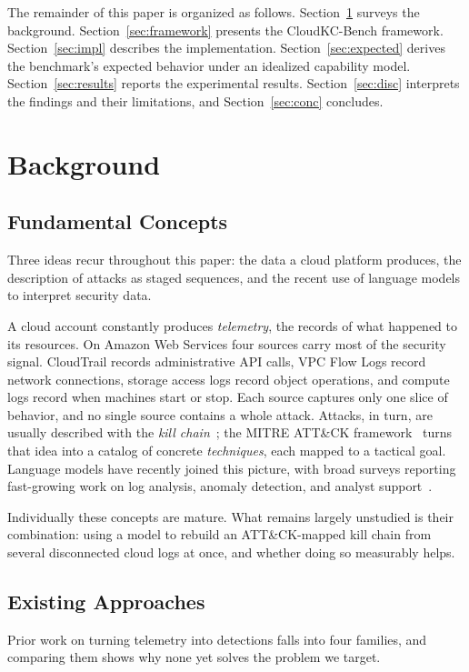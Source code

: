 \documentclass[journal]{IEEEtran}
\begin{document}
The remainder of this paper is organized as follows. Section~\ref{sec:bg} surveys the background.
Section~\ref{sec:framework} presents the CloudKC-Bench framework. Section~\ref{sec:impl} describes the
implementation. Section~\ref{sec:expected} derives the benchmark's expected behavior under an idealized
capability model. Section~\ref{sec:results} reports the experimental results. Section~\ref{sec:disc}
interprets the findings and their limitations, and Section~\ref{sec:conc} concludes.

\section{Background}\label{sec:bg}

\subsection{Fundamental Concepts}
Three ideas recur throughout this paper: the data a cloud platform produces, the description of attacks
as staged sequences, and the recent use of language models to interpret security data.

A cloud account constantly produces \emph{telemetry}, the records of what happened to its resources. On
Amazon Web Services four sources carry most of the security signal. CloudTrail records administrative
API calls, VPC Flow Logs record network connections, storage access logs record object operations, and
compute logs record when machines start or stop. Each source captures only one slice of behavior, and no
single source contains a whole attack. Attacks, in turn, are usually described with the \emph{kill
chain}~\cite{hutchins}; the MITRE ATT\&CK framework~\cite{mitre} turns that idea into a catalog of
concrete \emph{techniques}, each mapped to a tactical goal. Language models have recently joined this
picture, with broad surveys reporting fast-growing work on log analysis, anomaly detection, and analyst
support~\cite{llmsurvey1, llmsurvey2, llmsurvey3}.

Individually these concepts are mature. What remains largely unstudied is their combination: using a
model to rebuild an ATT\&CK-mapped kill chain from several disconnected cloud logs at once, and whether
doing so measurably helps.

\subsection{Existing Approaches}
Prior work on turning telemetry into detections falls into four families, and comparing them shows why
none yet solves the problem we target.
\end{document}
